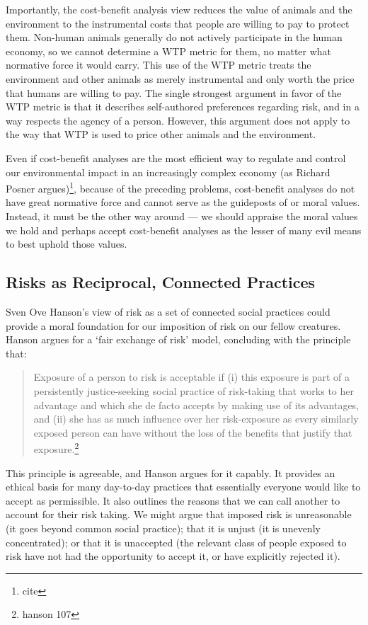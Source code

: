 \documentclass[12pt]{article}
\begin{document}
Importantly, the cost-benefit analysis view reduces the value of animals and
the environment to the instrumental costs that people are willing to pay to
protect them. Non-human animals generally do not actively participate in the
human economy, so we cannot determine a WTP metric for them, no matter what
normative force it would carry. This use of the WTP metric treats the
environment and other animals as merely instrumental and only worth the price
that humans are willing to pay. The single strongest argument in favor of the
WTP metric is that it describes self-authored preferences regarding risk, and
in a way respects the agency of a person. However, this argument does not apply
to the way that WTP is used to price other animals and the environment.

Even if cost-benefit analyses are the most efficient way to regulate and
control our environmental impact in an increasingly complex economy (as Richard
Posner argues)\footnote{cite}, because of the preceding problems, cost-benefit
analyses do not have great normative force and cannot serve as the guideposts
of or moral values.  Instead, it must be the other way around --- we should
appraise the moral values we hold and perhaps accept cost-benefit analyses as
the lesser of many evil means to best uphold those values.

\subsection{Risks as Reciprocal, Connected Practices}

Sven Ove Hanson’s view of risk as a set of connected social practices could
provide a moral foundation for our imposition of risk on our fellow creatures.
Hanson argues for a ‘fair exchange of risk’ model, concluding with the principle
that:

\begin{quote}
  Exposure of a person to risk is acceptable if (i) this exposure is part of a
  persistently justice-seeking social practice of risk-taking that works to her
  advantage and which she de facto accepts by making use of its advantages, and
  (ii) she has as much influence over her risk-exposure as every similarly
  exposed person can have without the loss of the benefits that justify that
  exposure.\footnote{hanson 107}
\end{quote}

This principle is agreeable, and Hanson argues for it capably. It provides an
ethical basis for many day-to-day practices that essentially everyone would
like to accept as permissible.  It also outlines the reasons that  we can call
another to account for their risk taking.  We might argue that imposed risk is
unreasonable (it goes beyond common social practice); that it is unjust (it is
unevenly concentrated); or that it is unaccepted (the relevant class of people
exposed to risk have not had the opportunity to accept it, or have explicitly
rejected it).
\end{document}
